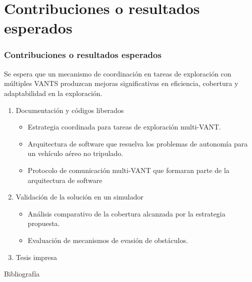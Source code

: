 \documentclass[
  24pt, %
  aspectratio=169, %
]{beamer}
\begin{document}

\section{Contribuciones o resultados esperados}
\begin{frame}
  \frametitle{Contribuciones o resultados esperados}
  Se espera que un mecanismo de coordinación en tareas de exploración con múltiples VANTS produzcan mejoras significativas en eficiencia, cobertura y adaptabilidad en la exploración.
  \begin{enumerate}
  \item<1-> Documentación y códigos liberados
    \begin{itemize}
    \item Estrategia coordinada para tareas de exploración multi-VANT.
    \item Arquitectura de software que resuelva los problemas de autonomía para un vehículo aéreo no tripulado.
    \item Protocolo de comunicación multi-VANT que formaran parte de la arquitectura de software
    \end{itemize}
  \item<2-> Validación de la solución en un simulador
    \begin{itemize}
    \item Análisis comparativo de la cobertura alcanzada por la estrategia propuesta.
    \item Evaluación de mecanismos de evasión de obstáculos.
    \end{itemize}
  \item<3-> Tesis impresa
  \end{enumerate}
\end{frame}

\begin{frame}{Bibliografía}
  \tiny
  
  
\end{frame}
\end{document}
